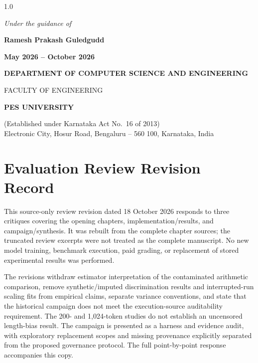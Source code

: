 \documentclass[12pt,a4paper]{report}
\begin{document}
\begin{titlepage}
\begin{spacing}{1.0}
\vspace{0.5em}
{\normalsize\itshape Under the guidance of\par}
\vspace{0.2em}
{\large\bfseries Ramesh Prakash Guledgudd\par}

\vspace{0.6em}
{\normalsize\bfseries\color{pesmaroon} May 2026 -- October 2026\par}

\vfill

{\normalsize\bfseries DEPARTMENT OF COMPUTER SCIENCE AND ENGINEERING\par}
{\normalsize FACULTY OF ENGINEERING\par}
{\large\bfseries PES UNIVERSITY\par}
{\footnotesize (Established under Karnataka Act No.\ 16 of 2013)\\
Electronic City, Hosur Road, Bengaluru -- 560 100, Karnataka, India\par}
\end{spacing}
\end{titlepage}



\chapter*{Evaluation Review Revision Record}
This source-only review revision dated 18 October 2026 responds to three critiques covering the opening chapters, implementation/results, and campaign/synthesis. It was rebuilt from the complete chapter sources; the truncated review excerpts were not treated as the complete manuscript. No new model training, benchmark execution, paid grading, or replacement of stored experimental results was performed.

The revisions withdraw estimator interpretation of the contaminated arithmetic comparison, remove synthetic/imputed discrimination results and interrupted-run scaling fits from empirical claims, separate variance conventions, and state that the historical campaign does not meet the execution-source auditability requirement. The 200- and 1,024-token studies do not establish an uncensored length-bias result. The campaign is presented as a harness and evidence audit, with exploratory replacement scopes and missing provenance explicitly separated from the proposed governance protocol. The full point-by-point response accompanies this copy.
\end{document}
